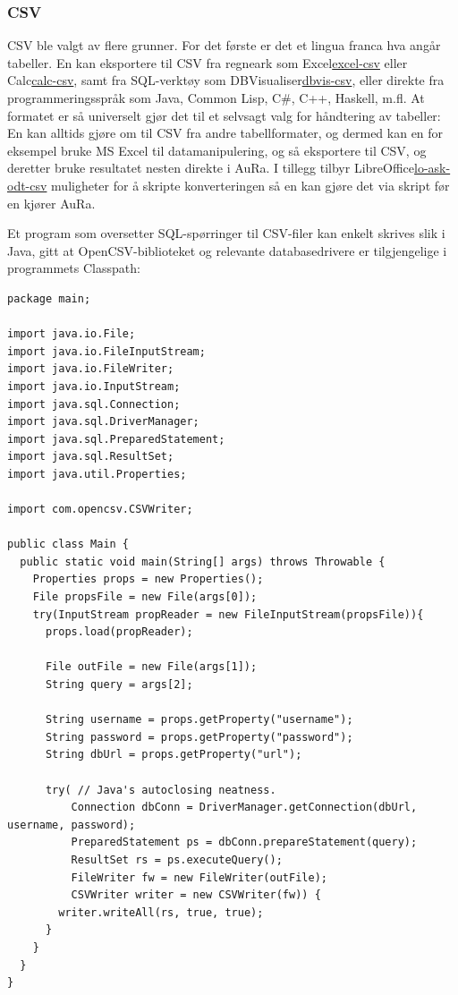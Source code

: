 \documentclass[norsk, 11pt, a4paper]{article}
\begin{document}
\subsubsection{CSV}
CSV ble valgt av flere grunner. For det første er det et lingua franca hva angår tabeller. En kan eksportere til CSV fra regneark som Excel\href{https://support.office.com/en-za/article/Import-or-export-text-txt-or-csv-files-5250ac4c-663c-47ce-937b-339e391393ba}{excel-csv} eller Calc\href{https://help.libreoffice.org/Calc/Importing(UNDERLINE and)Exporting(UNDERLINE CSV)Files}{calc-csv}, samt fra SQL-verktøy som DBVisualiser\href{http://www.dbvis.com/doc/9.0/doc/ug/exportImport/exportImport.html}{dbvis-csv}, eller direkte fra programmeringsspråk som Java, Common Lisp, C\#, C++, Haskell, m.fl. At formatet er så universelt gjør det til et selvsagt valg for håndtering av tabeller: En kan alltids gjøre om til CSV fra andre tabellformater, og dermed kan en for eksempel bruke MS Excel til datamanipulering, og så eksportere til CSV, og deretter bruke resultatet nesten direkte i AuRa. I tillegg tilbyr LibreOffice\href{http://ask.libreoffice.org/en/question/21916/cli-convert-ods-to-csv-with-semicolon-as-delimiter/}{lo-ask-odt-csv} muligheter for å skripte konverteringen så en kan gjøre det via skript før en kjører AuRa.

Et program som oversetter SQL-spørringer til CSV-filer kan enkelt skrives slik i Java, gitt at OpenCSV-biblioteket og relevante databasedrivere er tilgjengelige i programmets Classpath:

\lstset{language=Java}
\begin{lstlisting}
package main;

import java.io.File;
import java.io.FileInputStream;
import java.io.FileWriter;
import java.io.InputStream;
import java.sql.Connection;
import java.sql.DriverManager;
import java.sql.PreparedStatement;
import java.sql.ResultSet;
import java.util.Properties;

import com.opencsv.CSVWriter;

public class Main {
  public static void main(String[] args) throws Throwable {
    Properties props = new Properties();
    File propsFile = new File(args[0]);
    try(InputStream propReader = new FileInputStream(propsFile)){
      props.load(propReader);

      File outFile = new File(args[1]);
      String query = args[2];
      
      String username = props.getProperty("username");
      String password = props.getProperty("password");
      String dbUrl = props.getProperty("url");
    
      try( // Java's autoclosing neatness.
          Connection dbConn = DriverManager.getConnection(dbUrl, username, password);
          PreparedStatement ps = dbConn.prepareStatement(query);
          ResultSet rs = ps.executeQuery();
          FileWriter fw = new FileWriter(outFile);
          CSVWriter writer = new CSVWriter(fw)) {
        writer.writeAll(rs, true, true);
      }
    }
  }
}
\end{lstlisting}
\end{document}
